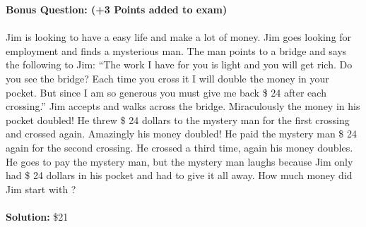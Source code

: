 \documentclass[12pt,letterpaper]{article}
\theoremstyle{plain}
\theoremstyle{definition}
\begin{document}
{\bf Bonus Question: (+3 Points added to exam)}\\
\ \\
Jim is looking to have a easy life and make a lot of money. Jim goes looking for employment and finds a mysterious man. The man points to a bridge and says the following to Jim: ``The work I have for you is light and you will get rich. Do you see the bridge? Each time you cross it I will double the money in your pocket. But since I am so generous you must give me back \$ 24 after each crossing.'' Jim accepts and walks across the bridge. Miraculously the money in his pocket doubled! He threw \$ 24 dollars to the mystery man for the first crossing and crossed again.  Amazingly his money doubled! He paid the mystery man \$ 24 again for the second crossing. He crossed a third time, again his money doubles. He goes to pay the mystery man, but the mystery man laughs because Jim only had \$ 24 dollars in his pocket and had to give it all away. How much money did Jim start with ?\\
\ \\
{\bf Solution: } \$21
\end{document}
